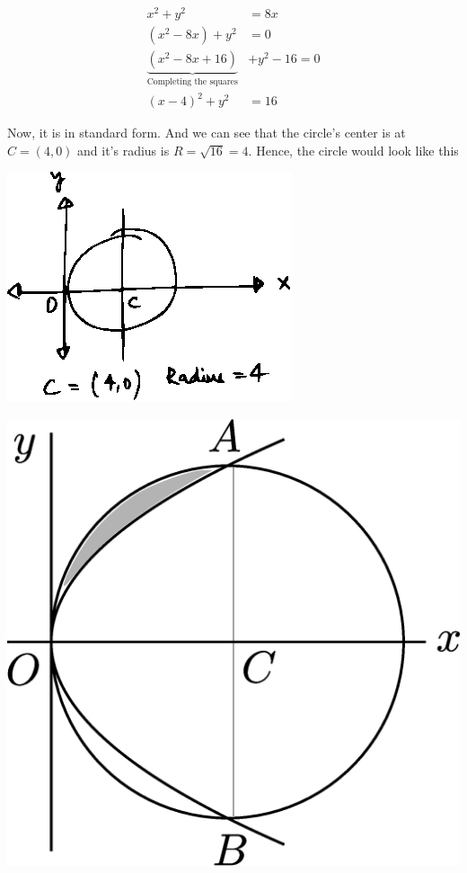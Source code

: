 \documentclass[14pt,fleqn]{extarticle}
\begin{document}
\begin{problem}
\begin{step}
     \begin{align}
x^2 + y^2 &= 8x \\
\left(x^2-8x \right)	 + y^2 &= 0 \\
\underbrace{\left(x^2-8x + 16 \right)}_{\text{Completing the squares}} &+ y^2 - 16 = 0 \\
\left(x-4 \right)^2 + y^2 &= 16 
\end{align}
       
       Now, it is in standard form. And we can see that the circle's center is at $C = \left(4,0 \right)$ and it's radius is $R = \sqrt{16} = 4$. Hence, the circle would look like this 
       
       \begin{center}
\includegraphics[scale=1.2]{1381-A.eps}
\end{center}
\end{step} 

\begin{step}
  \begin{options} 
     \correct 
       
       \begin{center}
\includegraphics[scale=0.2]{1381-C.eps}
\end{center}


\end{options}
\end{step}
\end{problem}
\end{document}
